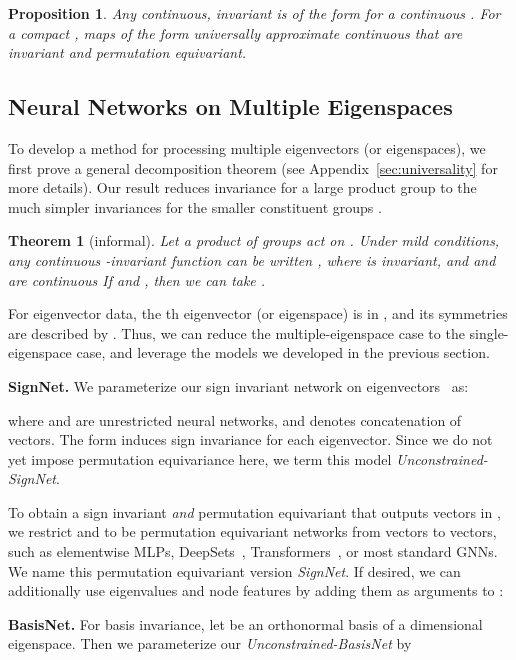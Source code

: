 \documentclass{article} \usepackage{iclr2023_conference,times}
\newtheorem{theorem}{Theorem}
\newtheorem{proposition}{Proposition}
\begin{document}
\begin{proposition}\label{prop:ign_universal}
    Any continuous,  invariant  is of the form  for a continuous . For a compact , maps of the form  universally approximate continuous   that are  invariant and permutation equivariant.
\end{proposition}


\subsection{Neural Networks on Multiple Eigenspaces}\label{sec: multiple spaces}

To develop a method for processing multiple eigenvectors (or eigenspaces), we first prove a general decomposition theorem (see Appendix~\ref{sec:universality} for more details). Our result reduces invariance for a large product group  to the much simpler invariances for the smaller constituent groups .

\begin{theorem}[informal]
Let a product of groups  act on . Under mild conditions, any continuous -invariant function  can be written , where  is  invariant, and  and  are continuous If  and , then we can take .
\end{theorem}
For eigenvector data, the th eigenvector (or eigenspace) is in , and its symmetries are described by . Thus, we can reduce the multiple-eigenspace case to the single-eigenspace case, and leverage the models we developed in the previous section.






\textbf{SignNet.} We parameterize our sign invariant network  on eigenvectors ~as:

where  and  are unrestricted neural networks, and  denotes concatenation of vectors. The form  induces sign invariance for each eigenvector. Since we do not yet impose permutation equivariance here, we term this model \emph{Unconstrained-SignNet}.


To obtain a sign invariant \emph{and} permutation equivariant  that outputs vectors in , we restrict  and  to be permutation equivariant networks from vectors to vectors, such as elementwise MLPs, DeepSets~\citep{zaheer2017deep}, Transformers~\citep{vaswani2017attention}, or most standard GNNs. We name this permutation equivariant version \textit{SignNet}. If desired, we can additionally use eigenvalues  and node features  by adding them as arguments to :


\textbf{BasisNet.} For basis invariance, let  be an orthonormal basis of a  dimensional eigenspace. Then we parameterize our \textit{Unconstrained-BasisNet}   by
\end{document}
